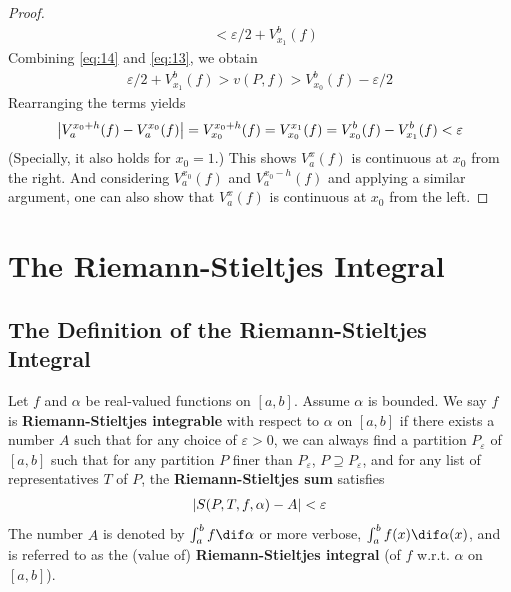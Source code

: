 \documentclass[thmcnt=section, color=blue, 12pt]{my-elegantbook}
\begin{document}
\begin{proof}
\begin{align}
		 & < \varepsilon/2 + V_{x_1}^b(f)
		\label{eq:13}
	\end{align}
	Combining \eqref{eq:14} and \eqref{eq:13}, we obtain
	\begin{align*}
		\varepsilon/2 + V_{x_1}^b(f) > v(P, f) > V_{x_0}^b(f) - \varepsilon/2
	\end{align*}
	Rearranging the terms yields
	\begin{align*}
		\left\lvert V_a^{x_0+h}(f) - V_a^{x_0}(f) \right\rvert
		= V_{x_0}^{x_0 + h}(f)
		= V_{x_0}^{x_1}(f)
		= V_{x_0}^b(f) - V_{x_1}^b(f)
		< \varepsilon
	\end{align*}
	(Specially, it also holds for $x_0 = 1$.)
	This shows $V_a^x(f)$ is continuous at $x_0$ from the right.
	And considering $V_a^{x_0}(f)$ and $V_a^{x_0-h}(f)$ and applying a similar argument,
	one can also show that $V_a^{x}(f)$ is continuous at $x_0$ from the left.
\end{proof}


\chapter{The Riemann-Stieltjes Integral}


\section{The Definition of the Riemann-Stieltjes Integral}

\begin{definition} \label{def:1}
	Let $f$ and $\alpha$ be real-valued functions on $[a, b]$.
	Assume $\alpha$ is bounded.
	We say $f$ is
	\textbf{Riemann-Stieltjes integrable}
	with respect to $\alpha$ on $[a, b]$
	if there exists a number $A$ such that
	for any choice of $\varepsilon > 0$,
	we can always find a partition $P_\varepsilon$ of $[a, b]$ such that
	for any partition $P$ finer than $P_\varepsilon$, $P \supseteq P_\varepsilon$,
	and for any list of representatives $T$ of $P$,
	the \textbf{Riemann-Stieltjes sum}
	satisfies
	\begin{align*}
		\left\lvert  S(P, T, f, \alpha) - A  \right\rvert < \varepsilon
	\end{align*}
	The number $A$ is denoted by $\int_a^b f \dif \alpha$
	or more verbose, $\int_a^b f(x) \dif \alpha(x)$,
	and is referred to as the (value of)
	\textbf{Riemann-Stieltjes integral}
	(of $f$ w.r.t. $\alpha$ on $[a, b]$).
\end{definition}
\end{document}
